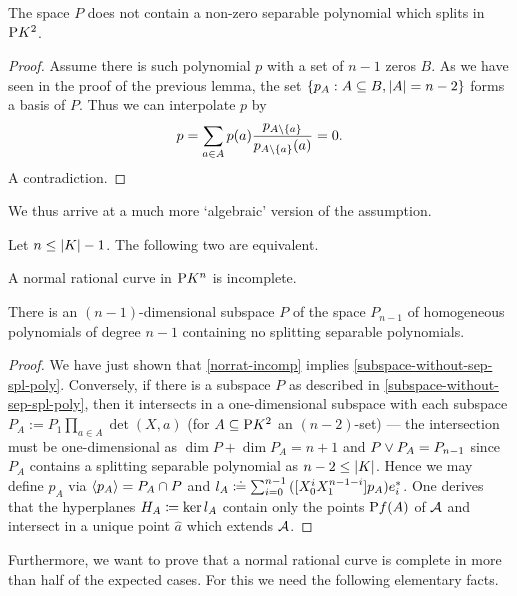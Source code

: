 \begin{lemma}
    The space $P$ does not contain a non-zero separable polynomial which splits in $\P K^2$.
\end{lemma}

\begin{proof}
    Assume there is such polynomial $p$ with a set of $n-1$ zeros $B$.
    As we have seen in the proof of the previous lemma, the set $\set{p_A:A\setleq B,\card A=n-2}$ forms a basis of $P$. Thus we can interpolate $p$ by
    $$
    p=\sum_{a\in A}{p(a)\frac{p_{A\setminus\set{a}}}{p_{A\setminus\set{a}}(a)}}=0.
    $$
    A contradiction.
\end{proof}

We thus arrive at a much more `algebraic' version of the assumption. 

\begin{lemma}\label{char-incomp-nor-rat-curve}
    Let $n\leq \left\vert{K}\right\vert -1$. The following two are equivalent.
    \begin{statements}
            \item A normal rational curve in $\P K^n$ is incomplete.\label{norrat-incomp}
            \item There is an $(n-1)$-dimensional subspace $P$ of the space $P_{n-1}$ of homogeneous polynomials of degree $n-1$ containing no splitting separable polynomials.\label{subspace-without-sep-spl-poly}
    \end{statements}
\end{lemma}

\begin{proof}
    We have just shown that \autoref{norrat-incomp} implies \autoref{subspace-without-sep-spl-poly}. Conversely, if there is a subspace $P$ as described in \autoref{subspace-without-sep-spl-poly}, then it intersects in a one-dimensional subspace with each subspace $P_A:=P_1\prod_{a\in A}{\det(X,a)}$ (for $A\setleq \P K^2$ an $(n-2)$-set) --- the intersection must be one-dimensional as $\dim P +\dim P_A=n+1$ and $P\vee P_A=P_{n-1}$ since $P_A$ contains a splitting separable polynomial as $n-2\leq \left\vert{K}\right\vert$. Hence we may define $p_A$ via $\gen{p_A}=P_A\setmeet P$ and $l_A\mathrel{\mathrel{\mathop:}\mkern-1.2mu\doteq}\sum_{i=0}^{n-1}{([X_0^i X_1^{n-1-i}]p_A){e}^{\ast}_i}$. One derives that the hyperplanes $H_A\mathrel{\mathrel{\mathop:}\mkern-1.2mu=}\ker l_A$ contain only the points $\P f(A)$ of $\mathcal{A}$ and intersect in a unique point $\hat a$ which extends $\mathcal{A}$.
\end{proof}

Furthermore, we want to prove that a normal rational curve is complete in more than half of the expected cases.
For this we need the following elementary facts.

